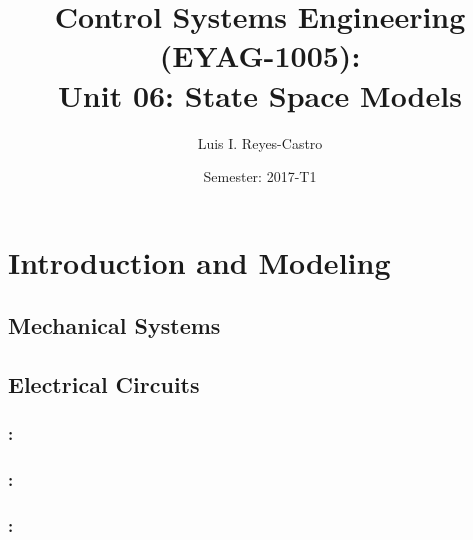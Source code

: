 \documentclass[ 10pt, xcolor = dvipsnames]{beamer}
\title[\shorttitle]{Control Systems Engineering (EYAG-1005): \\ \textbf{Unit 06:} State Space Models }
\author[L. I. Reyes-Castro]{Luis I. Reyes-Castro}
\institute[ESPOL]{\normalsize Escuela Superior Polit\'ecnica del Litoral (ESPOL) \\ Guayaquil - Ecuador}
\date[2017-T1]{Semester: 2017-T1}
\begin{document}



\section{Introduction and Modeling}

\begin{frame}[allowframebreaks]
\frametitle{\insertsection}

\end{frame}

\begin{frame}[allowframebreaks]
\frametitle{\insertsection}

\end{frame}

\subsection{Mechanical Systems}

\subsection{Electrical Circuits}

\begin{frame}[allowframebreaks]
\frametitle{\insertsection: \insertsubsection}

\end{frame}

\begin{frame}[allowframebreaks]
\frametitle{\insertsection: \insertsubsection}

\end{frame}

\begin{frame}[allowframebreaks]
\frametitle{\insertsection: \insertsubsection}

\end{frame}
\end{document}
